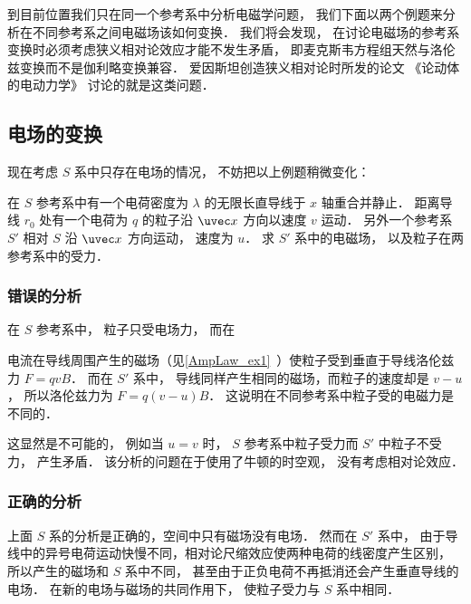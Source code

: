 
\begin{issues}
\issueDraft
\end{issues}


到目前位置我们只在同一个参考系中分析电磁学问题， 我们下面以两个例题来分析在不同参考系之间电磁场该如何变换． 我们将会发现， 在讨论电磁场的参考系变换时必须考虑狭义相对论效应才能不发生矛盾， 即麦克斯韦方程组天然与洛伦兹变换而不是伽利略变换兼容． 爱因斯坦创造狭义相对论时所发的论文 《论动体的电动力学》 讨论的就是这类问题．

\subsection{电场的变换}
现在考虑 $S$ 系中只存在电场的情况， 不妨把以上例题稍微变化：

在 $S$ 参考系中有一个电荷密度为 $\lambda$ 的无限长直导线于 $x$ 轴重合并静止． 距离导线 $r_0$ 处有一个电荷为 $q$ 的粒子沿 $\uvec x$ 方向以速度 $v$ 运动． 另外一个参考系 $S'$ 相对 $S$ 沿 $\uvec x$ 方向运动， 速度为 $u$． 求 $S'$ 系中的电磁场， 以及粒子在两参考系中的受力．

\subsubsection{错误的分析}
在 $S$ 参考系中， 粒子只受电场力， 而在

电流在导线周围产生的磁场（见\autoref{AmpLaw_ex1}~）使粒子受到垂直于导线洛伦兹力 $F = qvB$． 而在 $S'$ 系中， 导线同样产生相同的磁场，而粒子的速度却是 $v - u$， 所以洛伦兹力为 $F = q(v-u)B$． 这说明在不同参考系中粒子受的电磁力是不同的．

这显然是不可能的， 例如当 $u = v$ 时， $S$ 参考系中粒子受力而 $S'$ 中粒子不受力， 产生矛盾． 该分析的问题在于使用了牛顿的时空观， 没有考虑相对论效应．

\subsubsection{正确的分析}
上面 $S$ 系的分析是正确的，空间中只有磁场没有电场． 然而在 $S'$ 系中， 由于导线中的异号电荷运动快慢不同，相对论尺缩效应使两种电荷的线密度产生区别， 所以产生的磁场和 $S$ 系中不同， 甚至由于正负电荷不再抵消还会产生垂直导线的电场． 在新的电场与磁场的共同作用下， 使粒子受力与 $S$ 系中相同．

